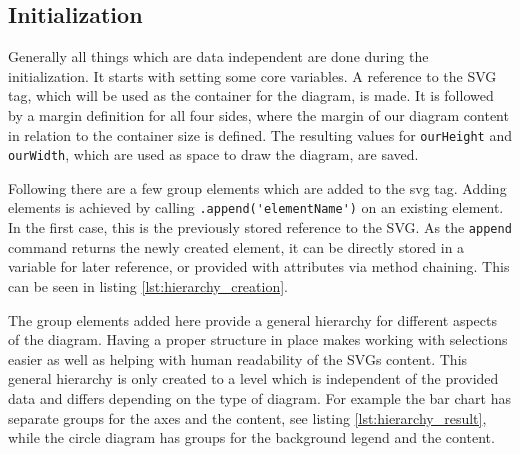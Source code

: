 \subsection{Initialization}
Generally all things which are data independent are done during the initialization. It starts with setting some core variables. A reference to the SVG tag, which will be used as the container for the diagram, is made. It is followed by a margin definition for all four sides, where the margin of our diagram content in relation to the container size is defined. The resulting values for \verb|ourHeight| and \verb|ourWidth|, which are used as space to draw the diagram, are saved. 

Following there are a few group elements which are added to the svg tag. Adding elements is achieved by calling \verb|.append('elementName')| on an existing element. In the first case, this is the previously stored reference to the SVG. As the \verb|append| command returns the newly created element, it can be directly stored in a variable for later reference, or provided with attributes via method chaining.  This can be seen in listing \ref{lst:hierarchy_creation}.

The group elements added here provide a general hierarchy for different aspects of the diagram. Having a proper structure in place makes working with selections easier as well as helping with human readability of the SVGs content. This general hierarchy is only created to a level which is independent of the provided data and differs depending on the type of diagram. For example the bar chart has separate groups for the axes and the content, see listing \ref{lst:hierarchy_result}, while the circle diagram has groups for the background legend and the content.

